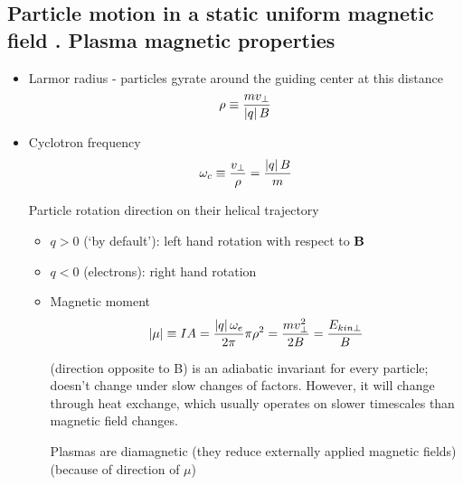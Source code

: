 	\subsection{Particle motion in a static uniform magnetic field . Plasma magnetic properties} 
		\begin{itemize}
			\item Larmor radius - particles gyrate around the guiding center at this distance
			\[\rho \equiv \frac{m v_{\perp}}{\left| q \right| B}\]
			\item Cyclotron frequency
			\[\omega_c \equiv \frac{v_{\perp}}{\rho} = \frac{\left| q \right| B}{m}\]
			
			Particle rotation direction on their helical trajectory
			\begin{itemize}
			\item $q>0$ (`by default'): left hand rotation with respect to $\mathbf{B}$
			\item $q<0$ (electrons): right hand rotation
			
			\item Magnetic moment
			\[\left| \mathbf{\mu} \right| \equiv I A = \frac{\left| q \right|\omega_e}{2\pi} \pi \rho^2 = \frac{m v_{\perp}^2}{2 B} = \frac{E_{kin \perp}}{B}\]
			
			(direction opposite to B)
			is an adiabatic invariant for every particle; doesn't change under slow changes of factors. However, it will change through heat exchange, which usually operates on slower timescales than magnetic field changes.
			
			Plasmas are diamagnetic (they reduce externally applied magnetic fields) (because of direction of $\mu$)
			\end{itemize}
		\end{itemize}

